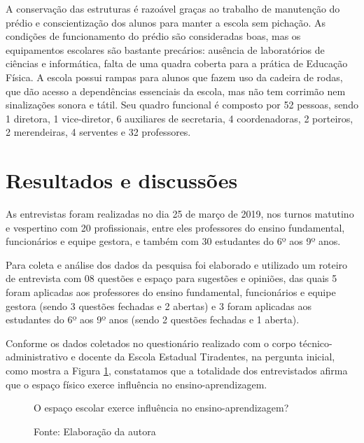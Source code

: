 \begin{refsection}
    A conservação das estruturas é razoável graças ao trabalho de manutenção do prédio e conscientização dos alunos para manter a escola sem pichação. As condições de funcionamento do prédio são consideradas boas, mas os equipamentos escolares são bastante precários: ausência de laboratórios de ciências e informática, falta de uma quadra coberta para a prática de Educação Física. A escola possui rampas para alunos que fazem uso da cadeira de rodas, que dão acesso a dependências essenciais da escola, mas não tem corrimão nem sinalizações sonora e tátil. Seu quadro funcional é composto por 52 pessoas, sendo 1 diretora, 1 vice-diretor, 6 auxiliares de secretaria, 4 coordenadoras, 2 porteiros, 2 merendeiras, 4 serventes e 32 professores. 


    \section{Resultados e discussões}

    As entrevistas foram realizadas no dia 25 de março de 2019, nos turnos matutino e vespertino com 20 profissionais, entre eles professores do ensino fundamental, funcionários e equipe gestora, e também com 30 estudantes do 6º aos 9º anos. 

    Para coleta e análise dos dados da pesquisa foi elaborado e utilizado um roteiro de entrevista com 08 questões e espaço para sugestões e opiniões, das quais 5 foram aplicadas aos professores do ensino fundamental, funcionários e equipe gestora (sendo 3 questões fechadas e 2 abertas) e 3 foram aplicadas aos estudantes do 6º aos 9º anos (sendo 2 questões fechadas e 1 aberta).  

    Conforme os dados coletados no questionário realizado com o corpo técnico-administrativo e docente da Escola Estadual Tiradentes, na pergunta inicial, como mostra a Figura \ref{fig:q1-result}, constatamos que a totalidade dos entrevistados afirma que o espaço físico exerce influência no ensino-aprendizagem.


    \begin{figure}[hb]
        \caption{O espaço escolar exerce influência no ensino-aprendizagem?}
        \label{fig:q1-result}
        \centering
        \caption*{Fonte: Elaboração da autora}
    \end{figure}



\end{refsection}
